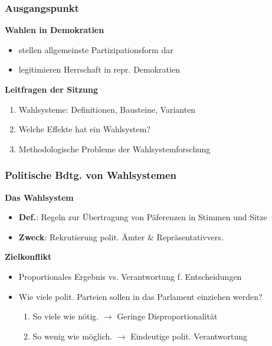 \documentclass{beamer}
\begin{document}
\maketitle

\begin{frame}
\frametitle{Ausgangspunkt}

\textbf{Wahlen in Demokratien}
\begin{itemize}
  \item stellen allgemeinste Partizipationsform dar
  \item legitimieren Herrschaft in repr. Demokratien
\end{itemize}

\textbf{Leitfragen der Sitzung}
\begin{enumerate}
  \item Wahlsysteme: Definitionen, Bausteine, Varianten
  \item Welche Effekte hat ein Wahlsystem?
  \item Methodologische Probleme der Wahlsystemforschung
\end{enumerate}
\end{frame}

\begin{frame}
\frametitle{Politische Bdtg. von Wahlsystemen}
\textbf{Das Wahlsystem}
\begin{itemize}
  \item \textbf{Def.}: Regeln zur Übertragung von Päferenzen in Stimmen und Sitze
  \item \textbf{Zweck}: Rekrutierung polit. Ämter \& Repräsentativvers.
\end{itemize}
\textbf{Zielkonflikt}
\begin{itemize}
  \item Proportionales Ergebnis vs. Verantwortung f. Entscheidungen
  \item Wie viele polit. Parteien sollen in das Parlament einziehen werden?
  \begin{enumerate}
    \item So viele wie nötig. $\rightarrow$ Geringe Disproportionalität
    \item So wenig wie möglich. $\rightarrow$ Eindeutige polit. Verantwortung
  \end{enumerate}
\end{itemize}
\end{frame}
\end{document}
